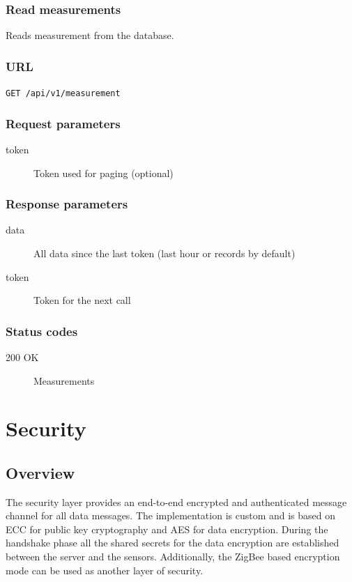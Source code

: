 \documentclass[a4paper,11pt]{scrartcl}
\begin{document}
\subsubsection{Read measurements}
Reads measurement from the database.

\subsubsection*{URL}
\texttt{GET /api/v1/measurement}

\subsubsection*{Request parameters}
\begin{description}
\item[token] Token used for paging (optional)
\end{description}

\subsubsection*{Response parameters}
\begin{description}
\item[data] All data since the last token (last hour or records by default)
\item[token] Token for the next call
\end{description}

\subsubsection*{Status codes}
\begin{description}
\item[200 OK] Measurements
\end{description}

\section{Security}\label{sec:security}
\subsection{Overview}
The security layer provides an end-to-end encrypted and authenticated message channel for all data messages. The implementation is custom and is based on ECC for public key cryptography and AES for data encryption. During the handshake phase all the shared secrets for the data encryption are established between the server and the sensors. Additionally, the ZigBee based encryption mode can be used as another layer of security.
\end{document}
